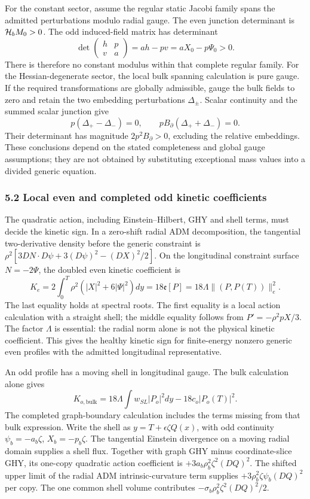 \documentclass[
  11pt,
]{article}
\begin{document}
For the constant sector, assume the regular static Jacobi family spans
the admitted perturbations modulo radial gauge. The even junction
determinant is \({\cal H}_bM_0>0\). The odd induced-field matrix has
determinant \[
 \det\begin{pmatrix}h&p\\v&a\end{pmatrix}
 =ah-pv=aX_0-p\Psi_0>0.                               \tag{31}
\] There is therefore no constant modulus within that complete regular
family. For the Hessian-degenerate sector, the local bulk spanning
calculation is pure gauge. If the required transformations are globally
admissible, gauge the bulk fields to zero and retain the two embedding
perturbations \(\Delta_\pm\). Scalar continuity and the summed scalar
junction give \[
 p(\Delta_+-\Delta_-)=0,\qquad
 pB_\partial(\Delta_++\Delta_-)=0.
 \tag{32}
\] Their determinant has magnitude \(2p^2B_\partial>0\), excluding the
relative embeddings. These conclusions depend on the stated completeness
and global gauge assumptions; they are not obtained by substituting
exceptional mass values into a divided generic equation.

\subsubsection{5.2 Local even and completed odd kinetic
coefficients}\label{local-even-and-completed-odd-kinetic-coefficients}

The quadratic action, including Einstein--Hilbert, GHY and shell terms,
must decide the kinetic sign. In a zero-shift radial ADM decomposition,
the tangential two-derivative density before the generic constraint is
\(\rho^2[3DN\!\cdot\!D\psi+3(D\psi)^2-(DX)^2/2]\). On the longitudinal
constraint surface \(N=-2\Psi\), the doubled even kinetic coefficient is
\[
 K_e=2\int_0^T\rho^2(|X|^2+6|\Psi|^2)dy
     =18{\mathfrak e}[P]
     =18\Lambda\|(P,P(T))\|_e^2.
 \tag{33}
\] The last equality holds at spectral roots. The first equality is a
local action calculation with a straight shell; the middle equality
follows from \(P'=-\rho^2pX/3\). The factor \(\Lambda\) is essential:
the radial norm alone is not the physical kinetic coefficient. This
gives the healthy kinetic sign for finite-energy nonzero generic even
profiles with the admitted longitudinal representative.

An odd profile has a moving shell in longitudinal gauge. The bulk
calculation alone gives \[
 K_{o,\mathrm{bulk}}=
 18\Lambda\int w_{SL}|P_o|^2dy-18c_o|P_o(T)|^2.
 \tag{34}
\] The completed graph-boundary calculation includes the terms missing
from that bulk expression. Write the shell as
\(y=T+\epsilon\zeta Q(x)\), with odd continuity \(\psi_b=-a_b\zeta\),
\(X_b=-p_b\zeta\). The tangential Einstein divergence on a moving radial
domain supplies a shell flux. Together with graph GHY minus
coordinate-slice GHY, its one-copy quadratic action coefficient is
\(+3a_b\rho_b^2\zeta^2(DQ)^2\). The shifted upper limit of the radial
ADM intrinsic-curvature term supplies \(+3\rho_b^2\zeta\psi_b(DQ)^2\)
per copy. The one common shell volume contributes
\(-\sigma_b\rho_b^2\zeta^2(DQ)^2/2\).
\end{document}
